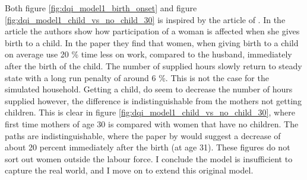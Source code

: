 Both figure \ref{fig:dqi_model1_birth_onset} and figure \ref{fig:dqi_model1_child_vs_no_child_30} is inspired by the article of \textcite{kleven_children_2019}. In the article the authors show how participation of a woman is affected when she gives birth to a child. In the paper they find that women,  when giving birth to a child on average use 20 \% time less on work, compared to the husband, immediately after the birth of the child. The number of supplied hours slowly return to steady state with a long run penalty of around 6 \%. This is not the case for the simulated household. Getting a child, do seem to decrease the number of hours supplied however, the difference is indistinguishable from the mothers not getting children. This is clear in figure \ref{fig:dqi_model1_child_vs_no_child_30}, where first time mothers of age 30 is compared with women that have no children. The paths are indistinguishable, where the paper by \textcite{kleven_children_2019} would suggest a decrease of about 20 percent immediately after the birth (at age 31). These figures do not sort out women outside the labour force. I conclude the model is insufficient to capture the real world, and I move on to extend this original model.



